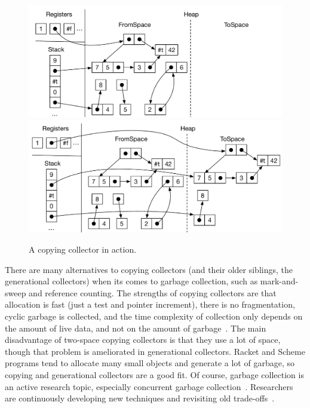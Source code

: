 \documentclass[11pt]{book}
\begin{document}
\begin{figure}[tbp]
\centering
\includegraphics[width=\textwidth]{figs/copy-collect-1} \\[5ex]
\includegraphics[width=\textwidth]{figs/copy-collect-2}
\caption{A copying collector in action.}
\label{fig:copying-collector}
\end{figure}

There are many alternatives to copying collectors (and their older
siblings, the generational collectors) when its comes to garbage
collection, such as mark-and-sweep and reference counting.  The
strengths of copying collectors are that allocation is fast (just a
test and pointer increment), there is no fragmentation, cyclic garbage
is collected, and the time complexity of collection only depends on
the amount of live data, and not on the amount of
garbage~\citep{Wilson:1992fk}. The main disadvantage of two-space
copying collectors is that they use a lot of space, though that
problem is ameliorated in generational collectors.  Racket and Scheme
programs tend to allocate many small objects and generate a lot of
garbage, so copying and generational collectors are a good fit.  Of
course, garbage collection is an active research topic, especially
concurrent garbage collection~\citep{Tene:2011kx}. Researchers are
continuously developing new techniques and revisiting old
trade-offs~\citep{Blackburn:2004aa,Jones:2011aa,Shahriyar:2013aa,Cutler:2015aa,Shidal:2015aa}.
\end{document}
